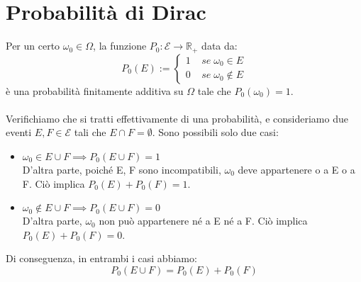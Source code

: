 \documentclass{article}
\begin{document}
\section*{Probabilità di Dirac}
Per un certo $\omega_{0} \in \Omega$, la funzione $P_{0}: \mathcal{E} \to \mathbb{R}_{+}$ data da:
\[ P_{0}(E) :=
\begin{cases}
1 \; \; \; \; se \; \omega_{0} \in E\\
0 \; \; \; \; se \; \omega_{0} \notin E
\end{cases}
\]
è una probabilità finitamente additiva su $\Omega$ tale che $P_{0}(\omega_{0}) = 1$.\\
\\
Verifichiamo che si tratti effettivamente di una probabilità, e consideriamo due eventi $E, F \in \mathcal{E}$ tali che $E \cap F = \emptyset$. Sono possibili solo due casi:
\begin{itemize}
\item $\omega_{0} \in E \cup F \implies P_{0}(E \cup F) = 1$\\
D'altra parte, poiché E, F sono incompatibili, $\omega_{0}$ deve appartenere o a E o a F. Ciò implica $P_{0}(E)+P_{0}(F)=1$.
\item $\omega_{0} \notin E \cup F \implies P_{0}(E \cup F) = 0$\\
D'altra parte, $\omega_{0}$ non può appartenere né a E né a F. Ciò implica\\
$P_{0}(E)+P_{0}(F)=0$.
\end{itemize}
Di conseguenza, in entrambi i casi abbiamo:
\[ P_{0}(E \cup F) = P_{0}(E)+P_{0}(F) \]
\end{document}

